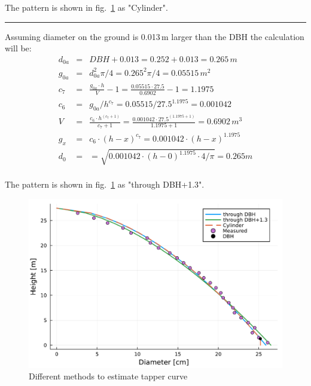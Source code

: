 \documentclass[twocolumn,10pt]{article}
\begin{document}
The pattern is shown in fig.~\ref{fig:trunk} as "Cylinder".

\par\noindent\rule{\columnwidth}{0.5pt}

Assuming diameter on the ground is 0.013\,m larger than the DBH the calculation
will be:
\begin{eqnarray*}
d_{0a} & = & DBH + 0.013 = 0.252 + 0.013 = 0.265\,m\\
g_{0a} & = & d_{0a}^2\pi/4 = 0.265^2\pi/4 = 0.05515\,m^2\\
c_7 & = & \frac{g_{0a} \cdot h}{V} - 1 = \frac{0.05515 \cdot 27.5}{0.6902} - 1 = 1.1975\\
c_6 & = & g_{0a} / h^{c_7} = 0.05515 / 27.5^{1.1975} = 0.001042\\
V & = & \frac{c_6 \cdot h^{(c_7 + 1)}}{c_7 + 1} =
\frac{0.001042 \cdot 27.5^{(1.1975 + 1)}}{1.1975 + 1} = 0.6902\,m^3\\
g_x & = & c_6 \cdot (h - x)^{c_7} = 0.001042 \cdot (h - x)^{1.1975}\\
d_0 & = & = \sqrt{0.001042 \cdot (h - 0)^{1.1975} \cdot 4/\pi} = 0.265m\\
\end{eqnarray*}

The pattern is shown in fig.~\ref{fig:trunk} as "through DBH+1.3".

\begin{figure}[htb]
    \includegraphics[width=\columnwidth]{trunk}
    \caption{Different methods to estimate tapper curve}
    \label{fig:trunk}
\end{figure}




\end{document}

